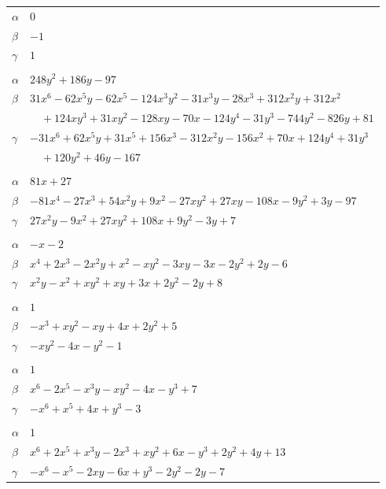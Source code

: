 \documentclass[11pt]{article}
\begin{document}
\begin{longtable}{@{}ll@{}}
$\alpha$ & $0$\\
$\beta$ & $-1$\\
$\gamma$ & $1$\\
\addlinespace[3pt]
\multicolumn{2}{@{}l}{$\{i,j\}=\{20,35\}$, $k_{ij}=2\cdot 5\cdot 7$}\\
$\alpha$ & $248y^{2}+186y-97$\\
$\beta$ & $31x^{6}-62x^{5}y-62x^{5}-124x^{3}y^{2}-31x^{3}y-28x^{3}+312x^{2}y+312x^{2}$\\
 & $\quad +124xy^{3}+31xy^{2}-128xy-70x-124y^{4}-31y^{3}-744y^{2}-826y+81$\\
$\gamma$ & $-31x^{6}+62x^{5}y+31x^{5}+156x^{3}-312x^{2}y-156x^{2}+70x+124y^{4}+31y^{3}$\\
 & $\quad +120y^{2}+46y-167$\\
\addlinespace[3pt]
\multicolumn{2}{@{}l}{$\{i,j\}=\{20,41\}$, $k_{ij}=2^{2}\cdot 5$}\\
$\alpha$ & $81x+27$\\
$\beta$ & $-81x^{4}-27x^{3}+54x^{2}y+9x^{2}-27xy^{2}+27xy-108x-9y^{2}+3y-97$\\
$\gamma$ & $27x^{2}y-9x^{2}+27xy^{2}+108x+9y^{2}-3y+7$\\
\addlinespace[3pt]
\multicolumn{2}{@{}l}{$\{i,j\}=\{20,42\}$, $k_{ij}=2\cdot 3$}\\
$\alpha$ & $-x-2$\\
$\beta$ & $x^{4}+2x^{3}-2x^{2}y+x^{2}-xy^{2}-3xy-3x-2y^{2}+2y-6$\\
$\gamma$ & $x^{2}y-x^{2}+xy^{2}+xy+3x+2y^{2}-2y+8$\\
\addlinespace[3pt]
\multicolumn{2}{@{}l}{$\{i,j\}=\{21,27\}$, $k_{ij}=1$}\\
$\alpha$ & $1$\\
$\beta$ & $-x^{3}+xy^{2}-xy+4x+2y^{2}+5$\\
$\gamma$ & $-xy^{2}-4x-y^{2}-1$\\
\addlinespace[3pt]
\multicolumn{2}{@{}l}{$\{i,j\}=\{21,35\}$, $k_{ij}=2^{2}$}\\
$\alpha$ & $1$\\
$\beta$ & $x^{6}-2x^{5}-x^{3}y-xy^{2}-4x-y^{3}+7$\\
$\gamma$ & $-x^{6}+x^{5}+4x+y^{3}-3$\\
\addlinespace[3pt]
\multicolumn{2}{@{}l}{$\{i,j\}=\{21,38\}$, $k_{ij}=2^{3}$}\\
$\alpha$ & $1$\\
$\beta$ & $x^{6}+2x^{5}+x^{3}y-2x^{3}+xy^{2}+6x-y^{3}+2y^{2}+4y+13$\\
$\gamma$ & $-x^{6}-x^{5}-2xy-6x+y^{3}-2y^{2}-2y-7$\\

\end{longtable}
\end{document}
